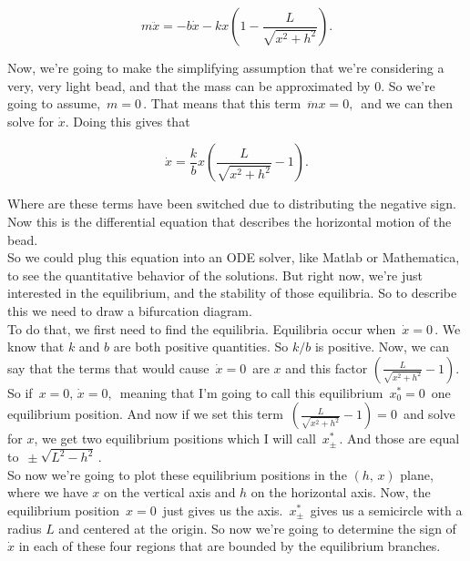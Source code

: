 \begin{equation*}
  m \ddot x = -b \dot x -kx \left(1-\frac{L}{\sqrt {x^2+h^2}}\right).
\end{equation*}

Now, we're going to make the simplifying assumption that we're considering a very, very light bead,
and that the mass can be approximated by $0$.
So we're going to assume, $\, m =  0\,$.
That means that this term $\, \ddot mx = 0,\,$ and we can then solve for $\dot x$.
Doing this gives that

\begin{equation*}
  \dot x = \frac{k}{b} x \left(\frac{L}{\sqrt {x^2+h^2}} - 1 \right).
\end{equation*}

Where are these terms have been switched due to distributing the negative sign.
Now this is the differential equation that describes the horizontal motion of the bead. \\
So we could plug this equation into an ODE solver,
like Matlab or Mathematica, to see the quantitative behavior
of the solutions.
But right now, we're just interested in the equilibrium,
and the stability of those equilibria.
So to describe this we need to draw a bifurcation diagram.\\

To do that, we first need to find the equilibria.
Equilibria occur when $\, \dot x  = 0\,$. 
We know that $k$ and $b$ are both positive quantities.
So $k/b$ is positive.
Now, we can say that the terms that would cause $\, \dot x = 0\,$
are $x$ and this factor $\displaystyle \left(\frac{L}{\sqrt {x^2+h^2}} - 1 \right)$.
So if $\, x = 0, \, \dot x = 0,\,$
meaning that I'm going to call this equilibrium $\, x_0 ^{*} = 0 \,$  one equilibrium position.
And now if we set this term $\, \displaystyle \left(\frac{L}{\sqrt {x^2+h^2}} - 1 \right) = 0 \, $
and solve for $x$, we get two equilibrium positions which I will
call $\, x_{\pm} ^{*}\,$.
And those are equal to $\, \pm \sqrt{L^2 - h^2} \,$. \\

So now we're going to plot these equilibrium positions
in the $(h,\,x)$ plane, where we have $x$ on the vertical axis
and $h$ on the horizontal axis.
Now, the equilibrium position $\,x = 0 \,$ just gives us the axis.
$\, x_{\pm} ^{*}\,$ gives us a semicircle with a radius $L$ and centered at the origin.
So now we're going to determine the sign of $\dot x$ in each of these four regions
that are bounded by the equilibrium branches.

